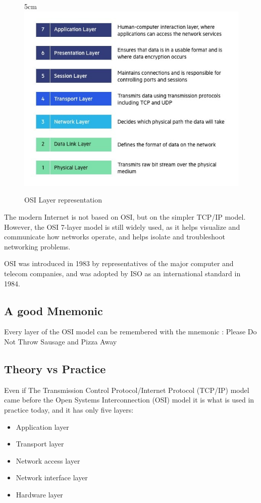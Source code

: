 \documentclass[a4paper,12pt]{article}
\begin{document}
\begin{figure}[21]{5cm}
\centering
\includegraphics[width=13cm]{./OSI-7-layers.jpg}
\caption{OSI Layer representation}\label{wrap-fig:5}
\end{figure}


The modern Internet is not based on OSI, but on the simpler TCP/IP model. However, the OSI 7-layer model is still widely used, as it helps visualize and communicate how networks operate, and helps isolate and troubleshoot networking problems.

OSI was introduced in 1983 by representatives of the major computer and telecom companies, and was adopted by ISO as an international standard in 1984.


\subsection{A good Mnemonic}
Every layer of the OSI model can be remembered with the mnemonic : Please Do Not Throw Sausage and Pizza Away

\subsection{Theory vs Practice}
Even if The Transmission Control Protocol/Internet Protocol (TCP/IP) model came before the Open Systems Interconnection (OSI) model it is what is used in practice today, and it has only five layers:

\begin{itemize}
\item {Application layer}
\item {Transport layer}
\item {Network access layer}
\item {Network interface layer}
\item {Hardware layer}
\end{itemize}
\end{document}
